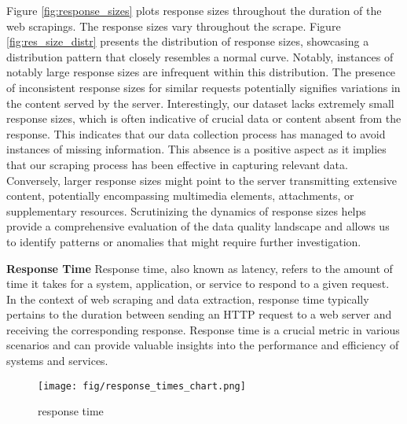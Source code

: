 \documentclass[12pt]{article} %
\begin{document}
{        Figure \ref{fig:response_sizes} plots response sizes throughout the duration of the web scrapings. The response sizes vary throughout the scrape. Figure \ref{fig:res_size_distr} presents the distribution of response sizes, showcasing a distribution pattern that closely resembles a normal curve. Notably, instances of notably large response sizes are infrequent within this distribution. The presence of inconsistent response sizes for similar requests potentially signifies variations in the content served by the server. Interestingly, our dataset lacks extremely small response sizes, which is often indicative of crucial data or content absent from the response. This indicates that our data collection process has managed to avoid instances of missing information. This absence is a positive aspect as it implies that our scraping process has been effective in capturing relevant data. Conversely, larger response sizes might point to the server transmitting extensive content, potentially encompassing multimedia elements, attachments, or supplementary resources. Scrutinizing the dynamics of response sizes helps provide a comprehensive evaluation of the data quality landscape and allows us to identify patterns or anomalies that might require further investigation.

        \textbf{Response Time}
        Response time, also known as latency, refers to the amount of time it takes for a system, application, or service to respond to a given request. In the context of web scraping and data extraction, response time typically pertains to the duration between sending an HTTP request to a web server and receiving the corresponding response. Response time is a crucial metric in various scenarios and can provide valuable insights into the performance and efficiency of systems and services. 


        \begin{figure}[]
            \centering
            \texttt{[image: fig/response\_times\_chart.png]}
            \caption{response time}
            \label{fig:res_time}
        \end{figure}

}
\end{document}
